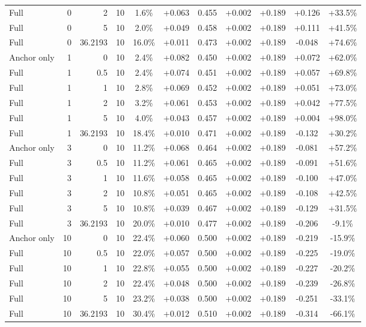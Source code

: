 \begin{table}[htbp]
\begin{tabular}{lrrrccccccc}
Full & 0 & 2 & 10 & 1.6\% & +0.063 & 0.455 & +0.002 & +0.189 & +0.126 & +33.5\% \\
Full & 0 & 5 & 10 & 2.0\% & +0.049 & 0.458 & +0.002 & +0.189 & +0.111 & +41.5\% \\
Full & 0 & 36.2193 & 10 & 16.0\% & +0.011 & 0.473 & +0.002 & +0.189 & -0.048 & +74.6\% \\
Anchor only & 1 & 0 & 10 & 2.4\% & +0.082 & 0.450 & +0.002 & +0.189 & +0.072 & +62.0\% \\
Full & 1 & 0.5 & 10 & 2.4\% & +0.074 & 0.451 & +0.002 & +0.189 & +0.057 & +69.8\% \\
Full & 1 & 1 & 10 & 2.8\% & +0.069 & 0.452 & +0.002 & +0.189 & +0.051 & +73.0\% \\
Full & 1 & 2 & 10 & 3.2\% & +0.061 & 0.453 & +0.002 & +0.189 & +0.042 & +77.5\% \\
Full & 1 & 5 & 10 & 4.0\% & +0.043 & 0.457 & +0.002 & +0.189 & +0.004 & +98.0\% \\
Full & 1 & 36.2193 & 10 & 18.4\% & +0.010 & 0.471 & +0.002 & +0.189 & -0.132 & +30.2\% \\
Anchor only & 3 & 0 & 10 & 11.2\% & +0.068 & 0.464 & +0.002 & +0.189 & -0.081 & +57.2\% \\
Full & 3 & 0.5 & 10 & 11.2\% & +0.061 & 0.465 & +0.002 & +0.189 & -0.091 & +51.6\% \\
Full & 3 & 1 & 10 & 11.6\% & +0.058 & 0.465 & +0.002 & +0.189 & -0.100 & +47.0\% \\
Full & 3 & 2 & 10 & 10.8\% & +0.051 & 0.465 & +0.002 & +0.189 & -0.108 & +42.5\% \\
Full & 3 & 5 & 10 & 10.8\% & +0.039 & 0.467 & +0.002 & +0.189 & -0.129 & +31.5\% \\
Full & 3 & 36.2193 & 10 & 20.0\% & +0.010 & 0.477 & +0.002 & +0.189 & -0.206 & -9.1\% \\
Anchor only & 10 & 0 & 10 & 22.4\% & +0.060 & 0.500 & +0.002 & +0.189 & -0.219 & -15.9\% \\
Full & 10 & 0.5 & 10 & 22.0\% & +0.057 & 0.500 & +0.002 & +0.189 & -0.225 & -19.0\% \\
Full & 10 & 1 & 10 & 22.8\% & +0.055 & 0.500 & +0.002 & +0.189 & -0.227 & -20.2\% \\
Full & 10 & 2 & 10 & 22.4\% & +0.048 & 0.500 & +0.002 & +0.189 & -0.239 & -26.8\% \\
Full & 10 & 5 & 10 & 23.2\% & +0.038 & 0.500 & +0.002 & +0.189 & -0.251 & -33.1\% \\
Full & 10 & 36.2193 & 10 & 30.4\% & +0.012 & 0.510 & +0.002 & +0.189 & -0.314 & -66.1\% \\

\end{tabular}
\end{table}
